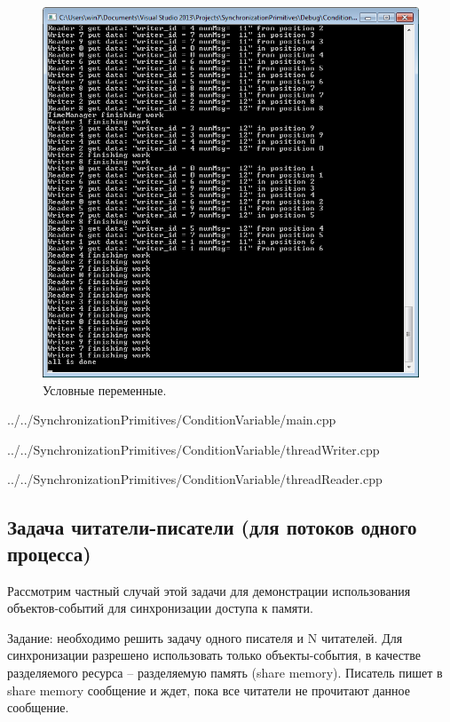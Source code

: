\documentclass[a4paper, 12pt]{article}		%
\begin{document}
\begin{figure}[h!]
\centering
\includegraphics[scale=1]{res/005}
\caption{Условные переменные.}
\end{figure}


{../../SynchronizationPrimitives/ConditionVariable/main.cpp}


{../../SynchronizationPrimitives/ConditionVariable/threadWriter.cpp}


{../../SynchronizationPrimitives/ConditionVariable/threadReader.cpp}

\newpage
\subsection{Задача читатели-писатели (для потоков одного процесса)}

Рассмотрим частный случай этой задачи для демонстрации использования объектов-событий для синхронизации доступа к памяти.


Задание: необходимо решить задачу одного писателя и N читателей. Для синхронизации разрешено использовать только объекты-события, в качестве разделяемого ресурса -- разделяемую память (share memory). Писатель пишет в share memory сообщение и ждет, пока все читатели не прочитают данное сообщение.
\end{document}
